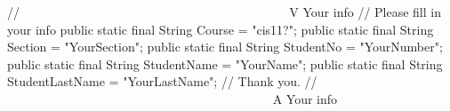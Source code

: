 \noindent\begin{minipage}{\linewidth}   %
\begin{javacode}
// ~~~~~~~~~~~~~~~~~~~~~~~~~~~~~~~~~~~~~~~~~~ V Your info
// Please fill in your info
public static final String Course = "cis11?";
public static final String Section = "YourSection";
public static final String StudentNo = "YourNumber";
public static final String StudentName = "YourName";
public static final String StudentLastName = "YourLastName";
// Thank you.
// ~~~~~~~~~~~~~~~~~~~~~~~~~~~~~~~~~~~~~~~~~~ A Your info
\end{javacode}
\end{minipage}
